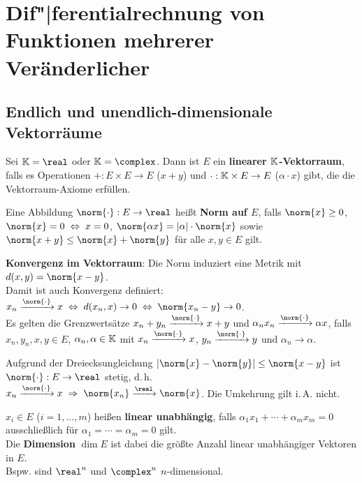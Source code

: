 \section{%
    Dif"|ferentialrechnung von Funktionen mehrerer Veränderlicher%
}

\subsection{%
    Endlich und unendlich-dimensionale Vektorräume%
}

Sei $\field = \real$ oder $\field = \complex$.
Dann ist $E$ ein \textbf{linearer $\mathbb{K}$-Vektorraum}, falls
es Operationen $+: E \times E \rightarrow E$ ($x + y$) und
$\cdot: \mathbb{K} \times E \rightarrow E$ ($\alpha \cdot x$) gibt, die
die Vektorraum-Axiome erfüllen.

Eine Abbildung $\norm{\cdot}: E \rightarrow \real$ heißt \textbf{Norm auf $E$},
falls $\norm{x} \ge 0$, $\norm{x} = 0 \;\Leftrightarrow\; x = 0$,
$\norm{\alpha x} = |\alpha| \cdot \norm{x}$ sowie
$\norm{x + y} \le \norm{x} + \norm{y}$ für alle $x, y \in E$ gilt.

\textbf{Konvergenz im Vektorraum}:
Die Norm induziert eine Metrik mit $d(x, y) = \norm{x - y}$. \\
Damit ist auch Konvergenz definiert:
$x_n \xrightarrow{\norm{\cdot}} x \;\Leftrightarrow\; d(x_n, x) \to 0
\;\Leftrightarrow\; \norm{x_n - y} \to 0$. \\
Es gelten die Grenzwertsätze $x_n + y_n \xrightarrow{\norm{\cdot}} x + y$
und $\alpha_n x_n \xrightarrow{\norm{\cdot}} \alpha x$, falls
$x_n, y_n, x, y \in E$, $\alpha_n, \alpha \in \mathbb{K}$ mit
$x_n \xrightarrow{\norm{\cdot}} x$,
$y_n \xrightarrow{\norm{\cdot}} y$ und $\alpha_n \to \alpha$.

Aufgrund der Dreiecksungleichung $|\norm{x} - \norm{y}| \le \norm{x - y}$
ist $\norm{\cdot}: E \rightarrow \real$ stetig, d.\,h. \\
$x_n \xrightarrow{\norm{\cdot}} x \;\Rightarrow\;
\norm{x_n} \xrightarrow{\real} \norm{x}$.
Die Umkehrung gilt i.\,A. nicht.

\linie

$x_i \in E$ ($i = 1, \dotsc, m$) heißen \textbf{linear unabhängig}, falls
$\alpha_1 x_1 + \dotsb + \alpha_m x_m = 0$ ausschließlich für
$\alpha_1 = \dotsb = \alpha_m = 0$ gilt. \\
Die \textbf{Dimension} $\dim E$ ist dabei die größte Anzahl linear unabhängiger
Vektoren in $E$. \\
Bspw. sind $\real^n$ und $\complex^n$ $n$-dimensional.

